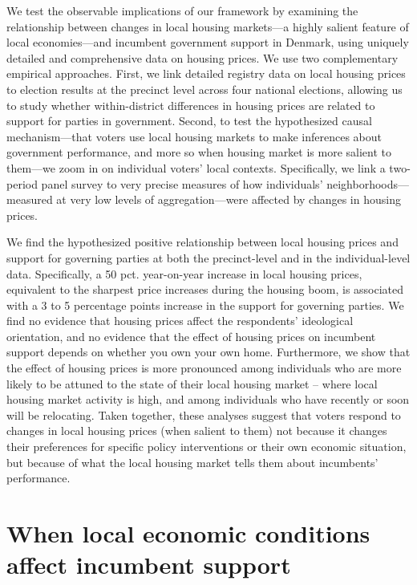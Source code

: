 \documentclass[12pt,a4paper]{article}
\begin{document}
	We test the observable implications of our framework by examining the relationship between changes in local housing markets—a highly salient feature of local economies—and incumbent government support in Denmark, using uniquely detailed and comprehensive data on housing prices. We use two complementary empirical approaches. First, we link detailed registry data on local housing prices to election results at the precinct level across four national elections, allowing us to study whether within-district differences in housing prices are related to support for parties in government. Second, to test the hypothesized causal mechanism—that voters use local housing markets to make inferences about government performance, and more so when housing market is more salient to them—we zoom in on individual voters' local contexts. Specifically, we link a two-period panel survey to very precise measures of how individuals' neighborhoods—measured at very low levels of aggregation—were affected by changes in housing prices.
	
	We find the hypothesized positive relationship between local housing prices and support for governing parties at both the precinct-level and in the individual-level data. Specifically, a 50 pct. year-on-year increase in local housing prices, equivalent to the sharpest price increases during the housing boom, is associated with a 3 to 5 percentage points increase in the support for governing parties. We find no evidence that housing prices affect the respondents’ ideological orientation, and no evidence that the effect of housing prices on incumbent support depends on whether you own your own home. Furthermore, we show that the effect of housing prices is more pronounced among individuals who are more likely to be attuned to the state of their local housing market -- where local housing market activity is high, and among individuals who have recently or soon will be relocating. Taken together, these analyses suggest that voters respond to changes in local housing prices (when salient to them) not because it changes their preferences for specific policy interventions or their own economic situation, but because of what the local housing market tells them about incumbents' performance.
	
	\section{When local economic conditions affect incumbent support}
	
\end{document}
